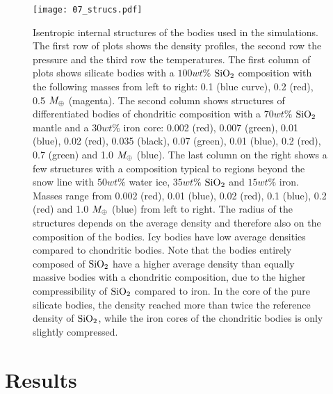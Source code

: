 \begin{figure}[htbp]
\begin{center}
\texttt{[image: 07\_strucs.pdf]}
\caption{Isentropic internal structures of the bodies used in the simulations. The first row of plots shows the density profiles, the second row the pressure and the third row the temperatures. The first column of plots shows silicate bodies with a $100 wt\%$ $\mathrm{SiO}_2$ composition with the following masses from left to right: 0.1 (blue curve), 0.2 (red), 0.5 $M_{\oplus}$ (magenta). The second column shows structures of differentiated bodies of chondritic composition with a $70 wt\%$ $\mathrm{SiO}_2$ mantle and a $30 wt\%$ iron core: 0.002 (red), 0.007 (green), 0.01 (blue), 0.02 (red), 0.035 (black), 0.07 (green), 0.01 (blue), 0.2 (red), 0.7 (green) and 1.0 $M_{\oplus}$ (blue). The last column on the right shows a few structures with a composition typical to regions beyond the snow line with $50 wt\%$ water ice, $35 wt\%$ $\mathrm{SiO}_2$ and $15 wt\%$ iron. Masses range from 0.002 (red), 0.01 (blue), 0.02 (red), 0.1 (blue), 0.2 (red) and 1.0 $M_{\oplus}$ (blue) from left to right. The radius of the structures depends on the average density and therefore also on the composition of the bodies. Icy bodies have low average densities compared to chondritic bodies. Note that the bodies entirely composed of $\mathrm{SiO}_2$ have a higher average density than equally massive bodies with a chondritic composition, due to the higher compressibility of $\mathrm{SiO}_2$ compared to iron. In the core of the pure silicate bodies, the density reached more than twice the reference density of $\mathrm{SiO}_2$, while the iron cores of the chondritic bodies is only slightly compressed.}
\label{ch03_fig07}
\end{center}
\end{figure}




\section{Results}

